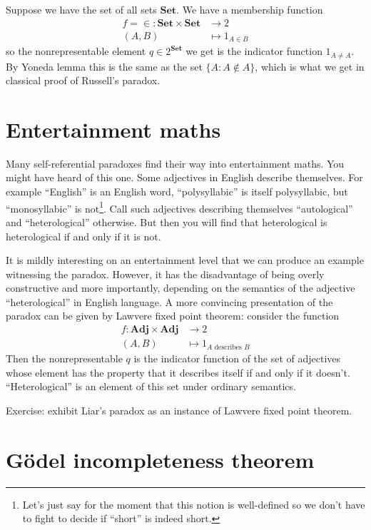 \documentclass[a4paper]{article}
\renewcommand{\c}[1]{\mathbf{#1}}
\newcommand{\Set}{{\c{Set}}}
\begin{document}
Suppose we have the set of all sets \(\Set\). We have a membership function
\begin{align*}
  f = \in: \Set \times \Set &\to 2 \\
  (A, B) &\mapsto 1_{A \in B}
\end{align*}
so the nonrepresentable element \(q \in 2^\Set\) we get is the indicator function \(1_{A \neq A}\). By Yoneda lemma this is the same as the set \(\{A: A \notin A\}\), which is what we get in classical proof of Russell's paradox.

\section{Entertainment maths}

Many self-referential paradoxes find their way into entertainment maths. You might have heard of this one. Some adjectives in English describe themselves. For example ``English'' is an English word, ``polysyllabic'' is itself polysyllabic, but ``monosyllabic'' is not\footnote{Let's just say for the moment that this notion is well-defined so we don't have to fight to decide if ``short'' is indeed short.}. Call such adjectives describing themselves ``autological'' and ``heterological'' otherwise. But then you will find that heterological is heterological if and only if it is not.

It is mildly interesting on an entertainment level that we can produce an example witnessing the paradox. However, it has the disadvantage of being overly constructive and more importantly, depending on the semantics of the adjective ``heterological'' in English language. A more convincing presentation of the paradox can be given by Lawvere fixed point theorem: consider the function
\begin{align*}
  f: \c{Adj} \times \c{Adj} &\to 2 \\
  (A, B) &\mapsto 1_{A \text{ describes } B}
\end{align*}
Then the nonrepresentable \(q\) is the indicator function of the set of adjectives whose element has the property that it describes itself if and only if it doesn't. ``Heterological'' is an element of this set under ordinary semantics.

Exercise: exhibit Liar's paradox as an instance of Lawvere fixed point theorem.

\section{Gödel incompleteness theorem}
\end{document}
